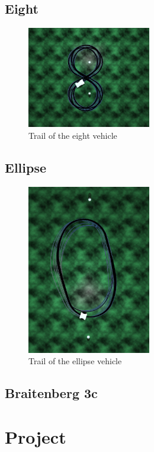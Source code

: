 \documentclass[a4paper]{article}
\begin{document}
\subsection{Eight}
\begin{figure}
	\begin{center}
		\includegraphics[width=0.48\textwidth]{trail/eight.png}
	\end{center}
	\caption{Trail of the eight vehicle}
\end{figure}

\subsection{Ellipse}
\begin{figure}
	\begin{center}
		\includegraphics[width=0.48\textwidth]{trail/ellipse.png}
	\end{center}
	\caption{Trail of the ellipse vehicle}
\end{figure}

\subsection{Braitenberg 3c}

\cleardoublepage
\section{Project}
\end{document}
